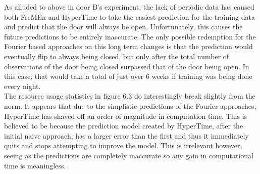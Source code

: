 \begin{table}[h!]
  \centering

  \caption{Door C Data Overview}
\end{table}

As alluded to above in door B's experiment, the lack of periodic data has
caused both FreMEn and HyperTime to take the easiest prediction for the
training data and predict that the door will always be open. Unfortunately,
this causes the future predictions to be entirely inaccurate. The only possible redemption
for the Fourier based approaches on this long term changes is that the
prediction would eventually flip to always being closed, but only after the total number of observations of the door being
closed surpassed that of the door being open. In this case, that would take a
total of just over 6 weeks if training was being done every night. \\

The resource usage statistics in figure 6.3 do interestingly break slightly
from the norm. It appears that due to the simplistic predictions of the
Fourier approaches, HyperTime has shaved off an order of magnitude in
computation time. This is believed to be because the prediction model created
by HyperTime, after the initial naive approach, has a larger error than the first and thus it immediately quits
and stops attempting to improve the model. This is irrelevant however, seeing
as the predictions are completely inaccurate so any gain in computational time
is meaningless.

